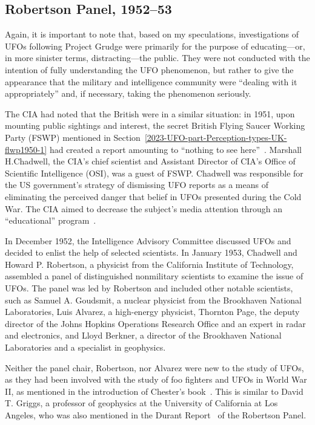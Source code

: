 \subsection{Robertson Panel, 1952--53}
\label{2023-UFO-part-Perception-types-USA-RP}

Again, it is important to note that, based on my speculations, investigations of UFOs following Project Grudge were primarily
for the purpose of educating---or, in more sinister terms, distracting---the public. They were not conducted with
the intention of fully understanding the UFO phenomenon,
but rather to give the appearance that the military and intelligence community were ``dealing with it appropriately''
and, if necessary, taking the phenomenon seriously.

The CIA had noted that the British were in a similar situation: in 1951, upon mounting public sightings and interest,
the secret British Flying Saucer Working Party (FSWP) mentioned in Section~\ref{2023-UFO-part-Perception-types-UK-flwp1950-1}
had created a report amounting to ``nothing to see here''~\cite{FSWP1951}.
Marshall H.Chadwell, the CIA's chief scientist and Assistant Director of CIA's Office of Scientific Intelligence (OSI), was a guest of FSWP. Chadwell was responsible for the US government's strategy of dismissing UFO reports as a means of eliminating the perceived danger that belief in UFOs presented during the Cold War. The CIA aimed to decrease the subject's media attention through an ``educational'' program~\cite{ClarkeFSWP}.

In December 1952, the Intelligence Advisory Committee discussed UFOs and decided to enlist the help of selected scientists.
In January 1953, Chadwell
and Howard P. Robertson, a physicist from the California Institute of Technology,
assembled a panel of distinguished nonmilitary scientists to examine the issue of UFOs.
The panel was led by Robertson and included other notable scientists, such as Samuel A. Goudsmit,
a nuclear physicist from the Brookhaven National Laboratories, Luis Alvarez,
a high-energy physicist, Thornton Page, the deputy director of the Johns Hopkins Operations Research Office and an expert in radar and electronics,
and Lloyd Berkner, a director of the Brookhaven National Laboratories and a specialist in geophysics.



Neither the panel chair, Robertson, nor Alvarez were new to the study of UFOs,
as they had been involved with the study of foo fighters and UFOs in World War II,
 as mentioned in the introduction of Chester's book~\cite{Chester2007May}.
This is similar to David T. Griggs, a professor of geophysics at the University of California at Los Angeles, who was also mentioned in the
Durant Report~\cite{RobertsonPanelDurantReport} of the Robertson Panel.

